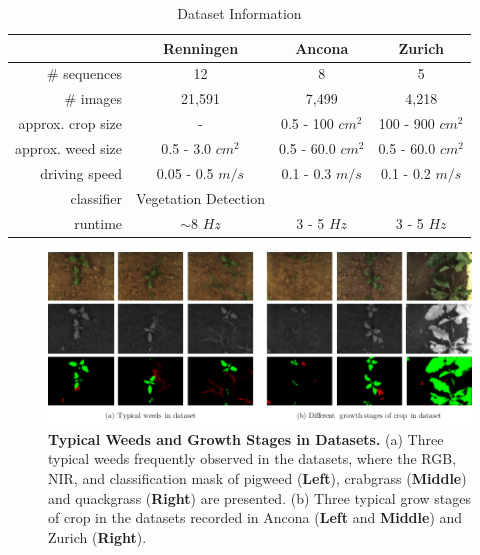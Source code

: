 \begin{table}[t]
\centering
\caption[Dataset Information]{Dataset Information} \label{tbl:argirobotics_datasets}
\begin{tabular}{rccc}
\hline
                  & \textbf{Renningen}      & \textbf{Ancona}                & \textbf{Zurich}                \\ \hline
$\#$ sequences     & 12             & 8                     & 5                     \\
$\#$ images        & 21,591               & 7,499                    & 4,218                      \\
approx. crop size & -              & 0.5 - 100 $cm^2$         & 100 - 900 $cm^2$         \\
approx. weed size & 0.5 - 3.0 $cm^2$  & 0.5 - 60.0 $cm^2$        & 0.5 - 60.0 $cm^2$        \\
driving speed     & 0.05 - 0.5 $m/s$  & 0.1 - 0.3 $m/s$          & 0.1 - 0.2 $m/s$          \\
classifier        & Vegetation Detection & \cite{lottes2017semi} & \cite{lottes2017semi} \\
runtime           & $\sim$8 $Hz$        & 3 - 5 $Hz$               & 3 - 5 $Hz$               \\ \hline
\end{tabular}
\end{table}

\begin{figure}[h] 
	\centering
	\includegraphics[width=\linewidth]{figures/agrirobotics/dataset.pdf}
	\caption[Typical Weeds and Growth Stages in Datasets]{ \textbf{Typical Weeds and Growth Stages in Datasets.} (a) Three typical weeds frequently observed in the datasets, where the RGB, NIR, and classification mask of pigweed (\textbf{Left}), crabgrass (\textbf{Middle}) and quackgrass (\textbf{Right}) are presented. (b) Three typical grow stages of crop in the datasets recorded in Ancona (\textbf{Left} and \textbf{Middle}) and Zurich (\textbf{Right}). 
	\label{fig:argirobotics_datasets}}
\end{figure} 


